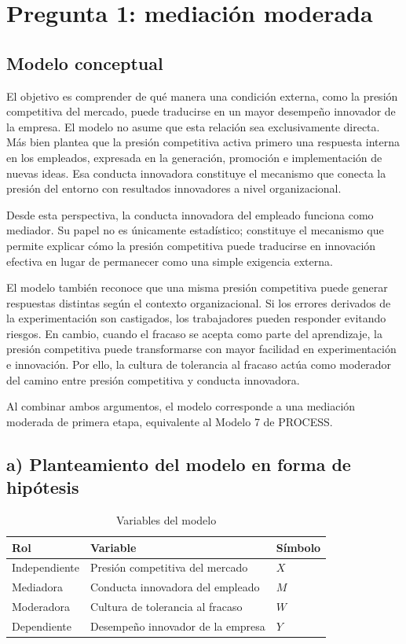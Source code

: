 \documentclass[12pt,letterpaper]{article}
\begin{document}
\newpage

\section{Pregunta 1: mediación moderada}

\subsection{Modelo conceptual}

El objetivo es comprender de qué manera una condición externa, como la presión competitiva del mercado, puede traducirse en un mayor desempeño innovador de la empresa. El modelo no asume que esta relación sea exclusivamente directa. Más bien plantea que la presión competitiva activa primero una respuesta interna en los empleados, expresada en la generación, promoción e implementación de nuevas ideas. Esa conducta innovadora constituye el mecanismo que conecta la presión del entorno con resultados innovadores a nivel organizacional.

Desde esta perspectiva, la conducta innovadora del empleado funciona como mediador. Su papel no es únicamente estadístico; constituye el mecanismo que permite explicar cómo la presión competitiva puede traducirse en innovación efectiva en lugar de permanecer como una simple exigencia externa.

El modelo también reconoce que una misma presión competitiva puede generar respuestas distintas según el contexto organizacional. Si los errores derivados de la experimentación son castigados, los trabajadores pueden responder evitando riesgos. En cambio, cuando el fracaso se acepta como parte del aprendizaje, la presión competitiva puede transformarse con mayor facilidad en experimentación e innovación. Por ello, la cultura de tolerancia al fracaso actúa como moderador del camino entre presión competitiva y conducta innovadora.

Al combinar ambos argumentos, el modelo corresponde a una mediación moderada de primera etapa, equivalente al Modelo 7 de PROCESS.

\subsection{a) Planteamiento del modelo en forma de hipótesis}

\begin{table}[H]
\centering
\caption{Variables del modelo}
\begin{tabular}{lll}
\toprule
Rol & Variable & Símbolo \\
\midrule
Independiente & Presión competitiva del mercado & $X$ \\
Mediadora & Conducta innovadora del empleado & $M$ \\
Moderadora & Cultura de tolerancia al fracaso & $W$ \\
Dependiente & Desempeño innovador de la empresa & $Y$ \\
\bottomrule
\end{tabular}
\end{table}
\end{document}
